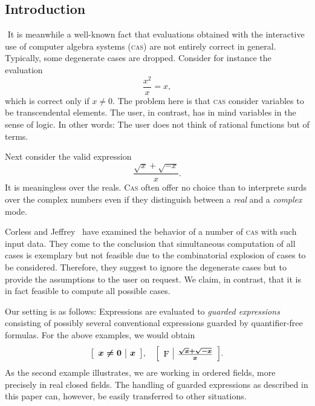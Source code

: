 
\subsection{Introduction}
\ifdefined\VerbMath
\(
\newenvironment{gex}{\left[\begin{array}{c|c}}{\end{array}\right]}
\newcommand{\gc}[1]{\boldsymbol{#1}}
\newcommand{\true}{\textrm{T}}
\newcommand{\false}{\textrm{F}}
\newcommand{\E}{\textrm{E}}
\newcommand{\GE}{\textrm{GE}}
\newcommand{\gscheme}{\textrm{gscheme}}
\newcommand{\sign}{\textrm{sign}}
\)%
\else
\newenvironment{gex}{\left[\begin{array}{c|c}}{\end{array}\right]}
\newcommand{\gc}[1]{\mbox{\boldmath$#1$}}
\newcommand{\true}{\textrm{T}}
\newcommand{\false}{\textrm{F}}
\newcommand{\E}{\textrm{E}}
\newcommand{\GE}{\textrm{GE}}
\newcommand{\gscheme}{\textrm{gscheme}}
\newcommand{\sign}{\textrm{sign}}
\fi
It is meanwhile a well-known fact that evaluations obtained with the
interactive use of computer algebra systems (\textsc{cas}) are not
entirely correct in general. Typically, some degenerate cases are
dropped. Consider for instance the evaluation
\[
\frac{x^2}{x}=x,
\]
which is correct only if $x\neq0$.
The problem here is that \textsc{cas} consider variables to be
transcendental elements. The user, in contrast, has in mind variables
in the sense of logic. In other words: The user does not think of
rational functions but of terms.

Next consider the valid expression
\[
\frac{\sqrt{x}+\sqrt{-x}}{x}.
\]
It is meaningless over the reals. \textsc{Cas} often offer no choice than
to interprete surds over the complex numbers even if they distinguish
between a {\em real} and a {\em complex} mode.

Corless and Jeffrey~\cite{CorlessJeffrey:92} have examined the
behavior of a number of \textsc{cas} with such input data. They come to
the conclusion that simultaneous computation of all cases is exemplary
but not feasible due to the combinatorial explosion of cases to be
considered. Therefore, they suggest to ignore the degenerate cases but
to provide the assumptions to the user on request. We claim, in
contrast, that it is in fact feasible to compute all possible cases.

Our setting is as follows: Expressions are evaluated to {\em guarded
expressions} consisting of possibly several conventional expressions
guarded by quantifier-free formulas. For the above examples, we would
obtain
\[
\begin{gex}
\gc{x\neq0}&\gc{x}
\end{gex},\quad
\begin{gex}
\gc{\false}&\gc{\frac{\sqrt{x}+\sqrt{-x}}{x}}
\end{gex}.
\]
As the second example illustrates, we are working in ordered fields,
more precisely in real closed fields. The handling of guarded
expressions as described in this paper can, however, be easily
transferred to other situations.

